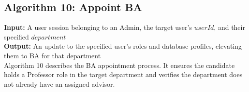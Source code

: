 
\subsection{Algorithm 10: Appoint BA}

\textbf{Input:} A user session belonging to an Admin, the target user's $userId$, and their specified $department$ \\
\textbf{Output:} An update to the specified user's roles and database profiles, elevating them to BA for that department \\

Algorithm 10 describes the BA appointment process. It ensures the candidate holds a Professor role in the target department and verifies the department does not already have an assigned advisor.

